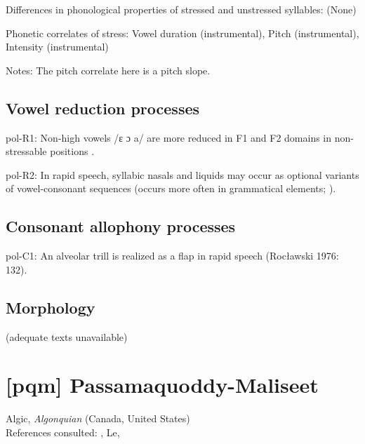 {\begin{appendixdesc}
\item[Differences in phonological properties of stressed and unstressed syllables:] (None)

\item[Phonetic correlates of stress:] Vowel duration (instrumental), Pitch (instrumental), Intensity (instrumental)

\item[Notes:] The pitch correlate here is a pitch slope.
\end{appendixdesc}
\subsection*{Vowel reduction processes}
\begin{appendixdesc}

\item[pol-R1:] Non-high vowels /ɛ ɔ a/ are more reduced in F1 and F2 domains in non-stressable positions \citep[378--379]{Nowak2006}.

\item[pol-R2:] In rapid speech, syllabic nasals and liquids may occur as optional variants of vowel-consonant sequences (occurs more often in grammatical elements; \citealt{Rubach1974}).
\end{appendixdesc}
\subsection*{Consonant allophony processes}
\begin{appendixdesc}

\item[pol-C1:] An alveolar trill is realized as a flap in rapid speech (Rocławski 1976: 132).
\end{appendixdesc}
\subsection*{Morphology}

(adequate texts unavailable)

\section*{[pqm] Passamaquoddy-Maliseet}  %
Algic, \textit{Algonquian} (Canada, United States)\medskip\\
References consulted: \citet{Leavitt1996}, Le\citet{Sourd1993}, \citet{Sherwood1986}

}
